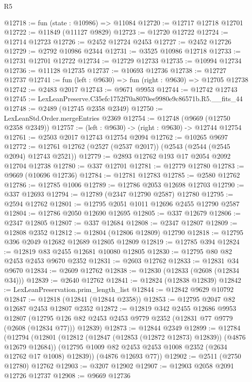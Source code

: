 \begin{lexlean}{R5}
\begin{coremodule}
@12718 := fun (state : @10986) => @11084
@12720 := @12717 @12718 @12701
@12722 := @11849 (@11127 @9829)
@12723 := @12720 @12722
@12724 := @12714 @12723
@12726 := @2452 @12724 @2453
@12727 := @2452 @12726
@12729 := @2792 @10986 @2344
@12731 := @3525 @10986 @12718
@12733 := @12731 @12701 @12722
@12734 := @12729 @12733
@12735 := @10994 @12734
@12736 := @11128 @12735
@12737 := @10693 @12736
@12738 := @12727 @12737
@12741 := fun (left : @9630) => fun (right : @9630) => @12705 @12738
@12742 := @2483 @2017
@12743 := @9671 @9953
@12744 := @12742 @12743
@12745 := LexLeanPreserve.C35efc1752f70a8070ee9980e9c86571b.R5.__fits_44
@12748 := @2489 (@12745 @2358 @2349)
@12750 := LexLeanStd.Order.mergeEntries @2369
@12754 := @12748 (@9669 (@12750 @2358 @2349))
@12757 := (left : @9630) -> (right : @9630) -> @12744 @12754
@12761 := @2503 @2017 @12743 @12754 @2094
@12762 := @10265 @9697
@12772 := @12761 @12762 (@2527 (@2537 @2017)) (@2543 (@2544 (@2545 @2094) @12743 @2521))
@12779 := @2893 @12762 @193 @17 @2054 @2092 @12704 @12738
@12780 := @337 @12701
@12781 := @12779 @12780
@12783 := @9669 (@10696 @12736)
@12784 := @12781 @12783
@12785 := @2580 @12762
@12786 := @12785 @1006
@12789 := @12786 @2053 @12698 @12703
@12790 := @337 @12693
@12794 := @12789 (@2347 @12790 @2587) @12780
@12795 := @2594 @12762
@12801 := @12795 @2051 @1011 @12696 @2455 @12790 @2587
@12804 := @12786 @2050 @12690 @12695
@12805 := @337 @12679
@12806 := @2347 @12805
@12807 := @337 @12684
@12808 := @2347 @12807
@12809 := @12808 @2352
@12812 := @12804 (@12806 @12809) @12790
@12818 := @12795 @396 @2049 @12682 @12689 @12805 @12809
@12819 := @12785 @394
@12824 := @12819 @83 @2455 @12681 @10080 @12805
@12830 := @12795 @80 @82 @2453 @2453 @9670 @2352
@12831 := @2603 @12762
@12833 := @12831 @34 @9670
@12834 := @2609 @12762
@12838 := @12830 (@12833 (@2608 (@12834 @34)))
@12839 := @2640 @12762
@12841 := @12824 (@12838 @12839)
@12842 := LexLeanPreservation.prim_length_list
@12844 := @12842 @9629 @10792
@12847 := @12818 (@12841 (@12844 @2358))
@12853 := @12795 @2047 @82 @12687 @2453 @12807 @2352
@12872 := @12819
    @342
    @2455
    @12686
    @9953
    @12807
    (@12795 @126 @82 @2453 @2453 @9779 @2352 (@12831 @77 @9779 (@2608 (@12834 @77))) @12839)
@12873 := @12844 @2349
@12899 := @12784
    (@12794
      (@12801
        (@12812 (@12847 (@12853 (@12872 @12873) @12839)) (@4876 @12679 @12684))
        (@12795 @1009 @82 @2453 @2453 @1008 @2352 (@2634 @12762 @17 @1008) @12839))
      (@4876 @12693 @77))
@12902 := @2511 (@2750 @12780) @12762
@12903 := @3207 @12902
@12907 := @12903 @2058 @2091 @12726 @12737
@12908 := @9669 @12736

\end{coremodule}
\end{lexlean}
